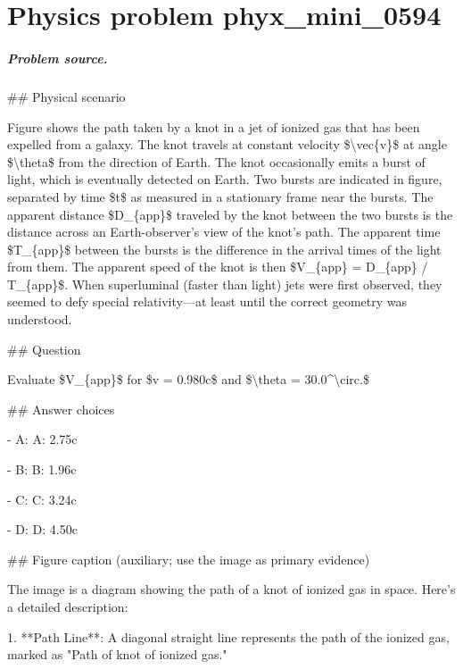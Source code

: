 
\chapter{Physics problem phyx\_mini\_0594}
\label{ch:PhyXMiniProblems_problem_phyx_mini_0594}

\paragraph{Problem source.}
\#\# Physical scenario

Figure shows the path taken by a knot in a jet of ionized gas that has been expelled from a galaxy. The knot travels at constant velocity \$\textbackslash{}vec\{v\}\$ at angle \$\textbackslash{}theta\$ from the direction of Earth. The knot occasionally emits a burst of light, which is eventually detected on Earth. Two bursts are indicated in figure, separated by time \$t\$ as measured in a stationary frame near the bursts.  The apparent distance \$D\_\{app\}\$ traveled by the knot between the two bursts is the distance across an Earth-observer's view of the knot's path. The apparent time \$T\_\{app\}\$ between the bursts is the difference in the arrival times of the light from them. The apparent speed of the knot is then \$V\_\{app\} = D\_\{app\} / T\_\{app\}\$.  When superluminal (faster than light) jets were first observed, they seemed to defy special relativity—at least until the correct geometry was understood.

\#\# Question

Evaluate \$V\_\{app\}\$ for \$v = 0.980c\$ and \$\textbackslash{}theta = 30.0\textasciicircum{}\textbackslash{}circ.\$

\#\# Answer choices

- A: A: 2.75c

- B: B: 1.96c

- C: C: 3.24c

- D: D: 4.50c

\#\# Figure caption (auxiliary; use the image as primary evidence)

The image is a diagram showing the path of a knot of ionized gas in space. Here's a detailed description:

1. **Path Line**: A diagonal straight line represents the path of the ionized gas, marked as "Path of knot of ionized gas."

